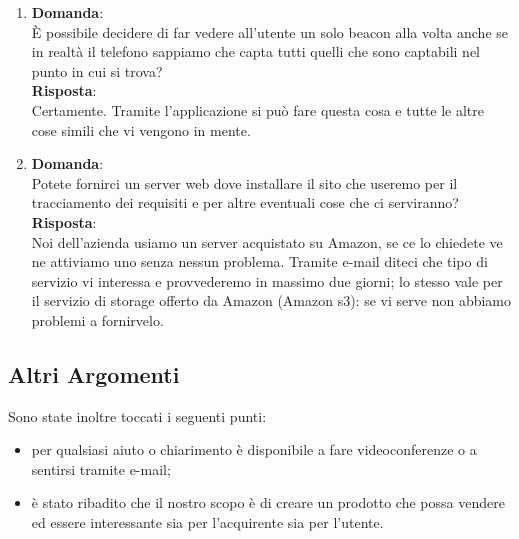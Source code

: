 \documentclass[a4paper,titlepage]{article}
\begin{document}
\begin{enumerate}
  \item \textbf{Domanda}:\\
  È possibile decidere di far vedere all'utente un solo beacon alla volta anche se in realtà il telefono sappiamo che capta tutti quelli che sono captabili nel punto in cui si trova?\\
  \textbf{Risposta}: \\ 
  Certamente. Tramite l'applicazione si può fare questa cosa e tutte le altre cose simili che vi vengono in mente.
  \item \textbf{Domanda}:\\
  Potete fornirci un server web dove installare il sito che useremo per il tracciamento dei requisiti e per altre eventuali cose che ci serviranno?\\
  \textbf{Risposta}: \\
  Noi dell'azienda usiamo un server acquistato su Amazon, se ce lo chiedete ve ne attiviamo uno senza nessun problema. Tramite e-mail diteci che tipo di servizio vi interessa e provvederemo in massimo due giorni; lo stesso vale per il servizio di storage offerto da Amazon (Amazon s3): se vi serve non abbiamo problemi a fornirvelo.
\end{enumerate}

\subsection{Altri Argomenti}
\label{sub:AltriArgomenti}

Sono state inoltre toccati i seguenti punti:

\begin{itemize}
  \item per qualsiasi aiuto o chiarimento \PROPONENTE {} è disponibile a fare videoconferenze o a sentirsi tramite e-mail;
  \item è stato ribadito che il nostro scopo è di creare un prodotto che possa vendere ed essere interessante sia per l'acquirente sia per l'utente.
\end{itemize}
\end{document}
